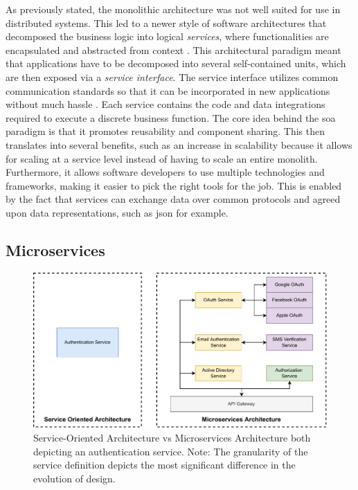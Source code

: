 As previously stated, the \gls{monolith}ic architecture was not well suited for use in distributed systems. This led to a newer style of software architectures that decomposed the business logic into  logical \textit{services}, where functionalities are encapsulated and abstracted from context \cite{perrey2003service}. This architectural paradigm meant that applications have to be decomposed into several self-contained units, which are then exposed via a \textit{service interface}. The service interface utilizes common communication standards so that it can be incorporated in new applications without much hassle \cite{ibm-soa}. Each service contains the code and data integrations required to execute a discrete business function. The core idea behind the \gls{soa} paradigm is that it promotes reusability and component sharing. This then translates into several benefits, such as an increase in scalability because it allows for scaling at a service level instead of having to scale an entire monolith. Furthermore, it allows software developers to use multiple technologies and frameworks, making it easier to pick the right tools for the job. This is enabled by the fact that services can exchange data over common protocols and agreed upon data representations, such as \gls{json} for example.


\subsection{Microservices}

\begin{figure}[!t]
    \centering
    
    \includegraphics[width=.8\linewidth]{2_background/figures/microservices-vs-soa.pdf}

    \caption{Service-Oriented Architecture vs Microservices Architecture both  depicting an authentication service. Note: The granularity of the service definition depicts the most significant difference in the evolution of design.}
    \label{fig:soa-vs-microservices}
\end{figure}

